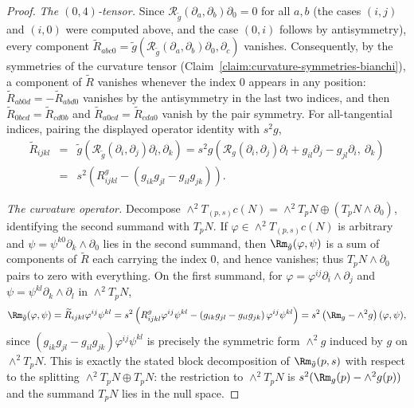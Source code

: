 \begin{proof}
\emph{The $(0,4)$-tensor.} Since ${\mathcal R}_{\tilde
g}(\partial_a,\partial_b)\partial_0=0$ for all $a,b$ (the cases
$(i,j)$ and $(i,0)$ were computed above, and the case $(0,i)$
follows by antisymmetry), every component
$\widetilde R_{abc0}=\tilde g({\mathcal
R}_{\tilde g}(\partial_a,\partial_b)\partial_0,\partial_c)$
vanishes. Consequently, by the symmetries of the curvature tensor
(Claim~\ref{claim:curvature-symmetries-bianchi}), a component of
$\widetilde R$ vanishes whenever the index $0$ appears in any
position: $\widetilde R_{ab0d}=-\widetilde R_{ab d0}$ vanishes by
the antisymmetry in the last two indices, and then $\widetilde
R_{0bcd}=\widetilde R_{cd0b}$ and $\widetilde R_{a0cd}=\widetilde
R_{cda0}$ vanish by the pair symmetry. For all-tangential indices,
pairing the displayed operator identity with $s^2g$,
\begin{eqnarray*}
\widetilde R_{ijkl}
& = & \tilde g\left({\mathcal R}_{\tilde
g}(\partial_i,\partial_j)\partial_l,\partial_k\right)
=s^2g\left({\mathcal R}_g(\partial_i,\partial_j)\partial_l
+g_{il}\partial_j-g_{jl}\partial_i,\ \partial_k\right)\\
& = & s^2\left(R^g_{ijkl}
-\left(g_{ik}g_{jl}-g_{il}g_{jk}\right)\right).
\end{eqnarray*}

\emph{The curvature operator.} Decompose
$\wedge^2T_{(p,s)}c(N)=\wedge^2T_pN\oplus\left(T_pN\wedge\partial_0\right)$,
identifying the second summand with $T_pN$. If
$\varphi\in\wedge^2T_{(p,s)}c(N)$ is arbitrary and
$\psi=\psi^{k0}\partial_k\wedge\partial_0$ lies in the second
summand, then $\Rm_{\tilde
g}(\varphi,\psi)$ is a sum of components of $\widetilde R$ each
carrying the index $0$, and hence vanishes; thus $T_pN\wedge
\partial_0$ pairs to zero with everything. On the first summand, for
$\varphi=\varphi^{ij}\partial_i\wedge\partial_j$ and
$\psi=\psi^{kl}\partial_k\wedge\partial_l$ in $\wedge^2T_pN$,
$$\Rm_{\tilde g}(\varphi,\psi)=\widetilde
R_{ijkl}\varphi^{ij}\psi^{kl}
=s^2\left(R^g_{ijkl}\varphi^{ij}\psi^{kl}
-\left(g_{ik}g_{jl}-g_{il}g_{jk}\right)\varphi^{ij}\psi^{kl}\right)
=s^2\left(\Rm_g-\wedge^2g\right)(\varphi,\psi),$$
since $(g_{ik}g_{jl}-g_{il}g_{jk})\varphi^{ij}\psi^{kl}$ is
precisely the symmetric form $\wedge^2g$ induced by $g$ on
$\wedge^2T_pN$. This is exactly the stated block decomposition of
$\Rm_{\tilde g}(p,s)$ with respect to the splitting
$\wedge^2T_pN\oplus T_pN$: the restriction to $\wedge^2T_pN$ is
$s^2(\Rm_g(p)-\wedge^2g(p))$ and the summand $T_pN$ lies in the null
space.
\end{proof}

